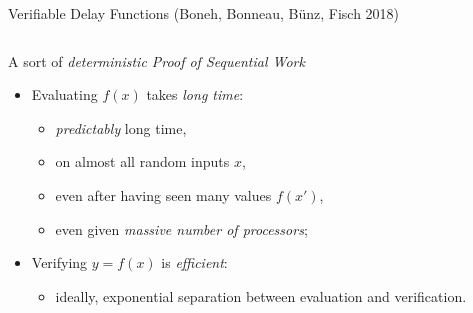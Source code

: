 \documentclass[aspectratio=169]{beamer}
\begin{document}
\begin{frame}{Verifiable Delay Functions (Boneh, Bonneau, Bünz, Fisch 2018)}
\begin{columns}
\begin{column}{0.75\textwidth}
\begin{block}{A sort of \textit{deterministic Proof of Sequential Work}}
        \begin{itemize}
        \item Evaluating $f(x)$ takes \emph{long time}:
          \begin{itemize}
          \item \emph{predictably} long time,
          \item on almost all random inputs $x$,
          \item even after having seen many values $f(x')$,
          \item even given \emph{massive number of processors};
          \end{itemize}
        \item Verifying $y=f(x)$ is \emph{efficient}:
          \begin{itemize}
          \item ideally, exponential separation between evaluation and
            verification.
          \end{itemize}
        \end{itemize}
      \end{block}
    \end{column}
  \end{columns}
\end{frame}

\end{document}
